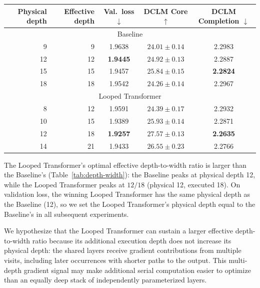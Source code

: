 \documentclass[]{bytedance_seed}
\theoremstyle{definition}
\theoremstyle{remark}
\begin{document}
\begin{center}
\begin{minipage}{\linewidth}
\small
{}
\label{tab:depth-width}
\centering
\begin{tabular}{rrccc}
\toprule
Physical depth & Effective depth &
Val.\ loss $\downarrow$ & DCLM Core $\uparrow$ & DCLM Completion $\downarrow$ \\
\midrule
\multicolumn{5}{c}{Baseline} \\
9  & 9  & 1.9638 & $24.01 \pm 0.14$ & 2.2983 \\
12 & 12 & \textbf{1.9445} & $24.92 \pm 0.13$ & 2.2887 \\
15 & 15 & 1.9457 & $\mathbf{25.84 \pm 0.15}$ & \textbf{2.2824} \\
18 & 18 & 1.9542 & $24.26 \pm 0.14$ & 2.2967 \\
\midrule
\multicolumn{5}{c}{Looped Transformer} \\
8  & 12 & 1.9591 & $24.39 \pm 0.17$ & 2.2932 \\
10 & 15 & 1.9389 & $25.93 \pm 0.14$ & 2.2871 \\
12 & 18 & \textbf{1.9257} & $\mathbf{27.57 \pm 0.13}$ & \textbf{2.2635} \\
14 & 21 & 1.9433 & $26.55 \pm 0.23$ & 2.2766 \\
\bottomrule
\end{tabular}
\end{minipage}
\end{center}

The Looped Transformer's optimal effective depth-to-width ratio is larger than the Baseline's (Table~\ref{tab:depth-width}): the Baseline peaks at physical depth 12, while the Looped Transformer peaks at $12/18$ (physical 12, executed 18).
%
On validation loss, the winning Looped Transformer has the same physical depth as the Baseline (12), so we set the Looped Transformer's physical depth equal to the Baseline's in all subsequent experiments.

We hypothesize that the Looped Transformer can sustain a larger effective depth-to-width ratio because its additional execution depth does not increase its physical depth: the shared layers receive gradient contributions from multiple visits, including later occurrences with shorter paths to the output.
This multi-depth gradient signal may make additional serial computation easier to optimize than an equally deep stack of independently parameterized layers.
%
\end{document}
